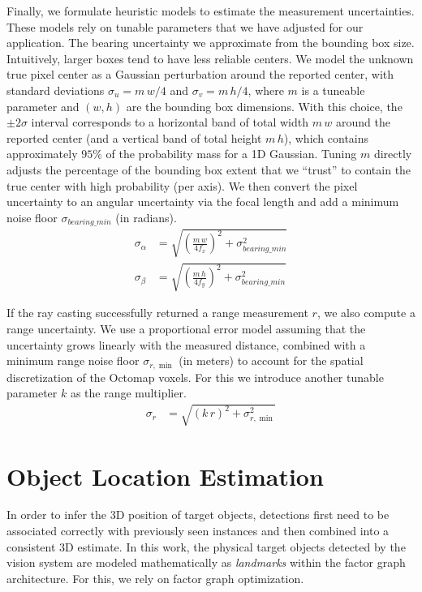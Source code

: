 \documentclass[
	parspace, %
	noindent, %
	final, %
]{elteikthesis}
\begin{document}
Finally, we formulate heuristic models to estimate the measurement uncertainties. These models rely on tunable parameters that we have adjusted for our application. The bearing uncertainty we approximate from the bounding box size. Intuitively, larger boxes tend to have less reliable centers. We model the unknown true pixel center as a Gaussian perturbation around the reported center, with standard deviations $\sigma_u = m\,w/4$ and $\sigma_v = m\,h/4$, where $m$ is a tuneable parameter and $(w, h)$ are the bounding box dimensions. With this choice, the $\pm 2\sigma$ interval corresponds to a horizontal band of total width $m\,w$ around the reported center (and a vertical band of total height $m\,h$), which contains approximately $95\%$ of the probability mass for a 1D Gaussian. Tuning $m$ directly adjusts the percentage of the bounding box extent that we ``trust'' to contain the true center with high probability (per axis). We then convert the pixel uncertainty to an angular uncertainty via the focal length and add a minimum noise floor $\sigma_{bearing\_min}$ (in radians). 
\begin{align}
\sigma_{\alpha} &= \sqrt{\left(\frac{m\,w}{4 f_x}\right)^2 + \sigma_{bearing\_min}^2} \\
\sigma_{\beta} &= \sqrt{\left(\frac{m\,h}{4 f_y}\right)^2 + \sigma_{bearing\_min}^2}
\end{align}

If the ray casting successfully returned a range measurement $r$, we also compute a range uncertainty. We use a proportional error model assuming that the uncertainty grows linearly with the measured distance, combined with a minimum range noise floor $\sigma_{r,\min}$ (in meters) to account for the spatial discretization of the Octomap voxels. For this we introduce another tunable parameter $k$ as the range multiplier.
\begin{align}
\sigma_{r} &= \sqrt{\left(k \, r\right)^2 + \sigma_{r,\min}^2}
\end{align}

\section{Object Location Estimation}
In order to infer the 3D position of target objects, detections first need to be associated correctly with previously seen instances and then combined into a consistent 3D estimate. In this work, the physical target objects detected by the vision system are modeled mathematically as \textit{landmarks} within the factor graph architecture. For this, we rely on factor graph optimization.
\end{document}
